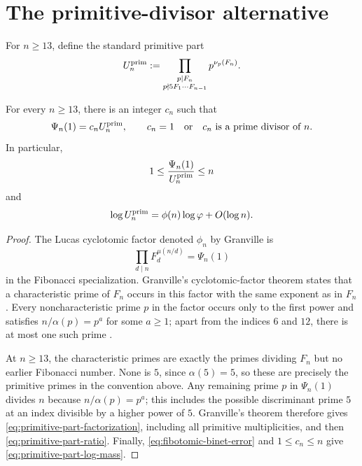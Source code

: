 \section{The primitive-divisor alternative}
\label{sec:primitive-alternative}

For $n\geq13$, define the standard primitive part
\[
 U_n^{\rm prim}:=
 \prod_{\substack{p\mid F_n\\p\nmid5F_1\cdots F_{n-1}}}
 p^{\nu_p(F_n)}.
\]

\begin{lemma}
\label{lem:classical-primitive-part}
For every $n\geq13$, there is an integer $c_n$ such that
\begin{equation}
\label{eq:primitive-part-factorization}
 \Psi_n(1)=c_nU_n^{\rm prim},
 \qquad
 c_n=1\quad\text{or}\quad c_n\text{ is a prime divisor of }n.
\end{equation}
In particular,
\begin{equation}
\label{eq:primitive-part-ratio}
 1\leq\frac{\Psi_n(1)}{U_n^{\rm prim}}\leq n
\end{equation}
and
\begin{equation}
\label{eq:primitive-part-log-mass}
 \log U_n^{\rm prim}=\phi(n)\log\varphi+O(\log n).
\end{equation}
\end{lemma}

\begin{proof}
The Lucas cyclotomic factor denoted $\phi_n$ by Granville is
\[
 \prod_{d\mid n}F_d^{\mu(n/d)}=\Psi_n(1)
\]
in the Fibonacci specialization.  Granville's cyclotomic-factor theorem
states that a characteristic prime of $F_n$ occurs in this factor with the
same exponent as in $F_n$.  Every noncharacteristic prime $p$ in the factor
occurs only to the first power and satisfies
$n/\alpha(p)=p^a$ for some $a\geq1$; apart from the indices $6$ and $12$,
there is at most one such prime
\cite[Corollaries~3 and~4]{Granville2012PrimitivePrimeFactors}.

At $n\geq13$, the characteristic primes are exactly the primes dividing
$F_n$ but no earlier Fibonacci number.  None is $5$, since
$\alpha(5)=5$, so these are precisely the primitive primes in the
convention above.  Any remaining prime $p$ in $\Psi_n(1)$ divides $n$
because $n/\alpha(p)=p^a$; this includes the possible discriminant prime
$5$ at an index divisible by a higher power of $5$.  Granville's theorem
therefore gives \eqref{eq:primitive-part-factorization}, including all
primitive multiplicities, and then \eqref{eq:primitive-part-ratio}.
Finally, \eqref{eq:fibotomic-binet-error} and $1\leq c_n\leq n$ give
\eqref{eq:primitive-part-log-mass}.
\end{proof}

